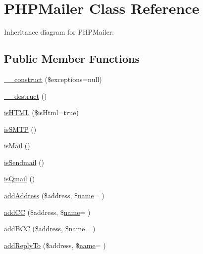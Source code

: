 \hypertarget{class_p_h_p_mailer}{}\section{P\+H\+P\+Mailer Class Reference}
\label{class_p_h_p_mailer}


Inheritance diagram for P\+H\+P\+Mailer\+:
\subsection*{Public Member Functions}
\begin{DoxyCompactItemize}
\item 
\hyperlink{class_p_h_p_mailer_a7dd626cfe1c29407eb37a713c631b5c7}{\+\_\+\+\_\+construct} (\$exceptions=null)
\item 
\hyperlink{class_p_h_p_mailer_a421831a265621325e1fdd19aace0c758}{\+\_\+\+\_\+destruct} ()
\item 
\hyperlink{class_p_h_p_mailer_af811636f1958d3a406ebf82e455c1f7a}{is\+H\+T\+ML} (\$is\+Html=true)
\item 
\hyperlink{class_p_h_p_mailer_ab7e6e8a95653c3562feff15f3f5795ff}{is\+S\+M\+TP} ()
\item 
\hyperlink{class_p_h_p_mailer_a279ce48bb3b7186d2efe04487708e082}{is\+Mail} ()
\item 
\hyperlink{class_p_h_p_mailer_a5a743c9fc5e1e0cae1b267d498bc16a9}{is\+Sendmail} ()
\item 
\hyperlink{class_p_h_p_mailer_a2b425dbd8364d95937c932d425c72f19}{is\+Qmail} ()
\item 
\hyperlink{class_p_h_p_mailer_ae2087944add1c9bf5647b9e9d49689a6}{add\+Address} (\$address, \$\hyperlink{user_8php_a765af5e9671743530143a6d3670fd9a6}{name}= \textquotesingle{}\textquotesingle{})
\item 
\hyperlink{class_p_h_p_mailer_acc911962347c94dd63dd595c397f4cb3}{add\+CC} (\$address, \$\hyperlink{user_8php_a765af5e9671743530143a6d3670fd9a6}{name}= \textquotesingle{}\textquotesingle{})
\item 
\hyperlink{class_p_h_p_mailer_a089e714287f7577eb8d0a7632e896900}{add\+B\+CC} (\$address, \$\hyperlink{user_8php_a765af5e9671743530143a6d3670fd9a6}{name}= \textquotesingle{}\textquotesingle{})
\item 
\hyperlink{class_p_h_p_mailer_aba5661a6b69f68826b39f4dc197e7a5d}{add\+Reply\+To} (\$address, \$\hyperlink{user_8php_a765af5e9671743530143a6d3670fd9a6}{name}= \textquotesingle{}\textquotesingle{})
\item 

\end{DoxyCompactItemize}
